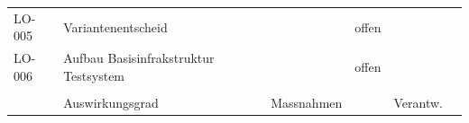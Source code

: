 \begin{table}[H]
{\begin{tabular}{lllllll}
LO-005                                                                      & \multicolumn{2}{l}{Variantenentscheid}                                                                                                                                                                    &                         & offen                                                                                                                                                        &                                                                                                                                                              &                                                                                                                               \\
LO-006                                                                      & \multicolumn{2}{l}{Aufbau Basisinfrakstruktur Testsystem}                                                                                                                                                 &                         & offen                                                                                                                                                        &                                                                                                                                                              &                                                                                                                               \\ \cline{1-3} \cline{5-7}
\multicolumn{7}{l}{}                                                                                                                                                                                                                                                                                                                                                                                                                                                                                                                                                                                                                                                                                                                                                            \\
\rowcolor[HTML]{A6A6A6}
\multicolumn{2}{l}{\cellcolor[HTML]{A6A6A6}{\color[HTML]{FFFFFF} \# Risiken}}                                                                                                     & {\color[HTML]{FFFFFF} Auswirkungsgrad}                                                               &                         & {\color[HTML]{FFFFFF} Massnahmen}                                                                                                                            & {\color[HTML]{FFFFFF} }                                                                                                                                      & {\color[HTML]{FFFFFF} Verantw.}                                                                                               \\

\end{tabular}}
\end{table}
